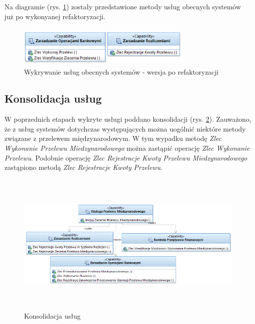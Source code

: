 Na diagramie (rys. \ref{legacy_systems_service_refactored}) zostały przedstawione metody usług obecnych systemów już po wykonyanej refaktoryzacji.

\begin{figure}[h!tbp]
\begin{centering}
\includegraphics[width=8.5cm, height=2cm]{img/legacy_systems_services_refactored.png}
\caption[Wykrywanie usług obecnych systemów - wersja po refaktoryzacji]{Wykrywanie usług obecnych systemów - wersja po refaktoryzacji}\label{legacy_systems_service_refactored}
\end{centering}
\end{figure}

\subsection{Konsolidacja usług}
W poprzednich etapach wykryte usługi poddano konsolidacji (rys. \ref{services_consolidation}). Zauważono, że z usług systemów dotychczas występujących można uogólnić niektóre metody związane z przelewem międzynarodowym. W tym wypadku metodę \emph{Zlec Wykonanie Przelewu Miedzynarodowego} można zastąpić operację \emph{Zlec Wykonanie Przelewu}. Podobnie operację \emph{Zlec Rejestracje Kwoty Przelewu Miedzynarodowego} zastąpiono metodą \emph{Zlec Rejestracje Kwoty Przelewu}.

\begin{figure}[h!tbp]
\begin{centering}
\includegraphics[width=16cm, height=7cm]{img/consolidation_services.png}
\caption[Konsolidacja usług]{Konsolidacja usług}\label{services_consolidation}
\end{centering}
\end{figure}


